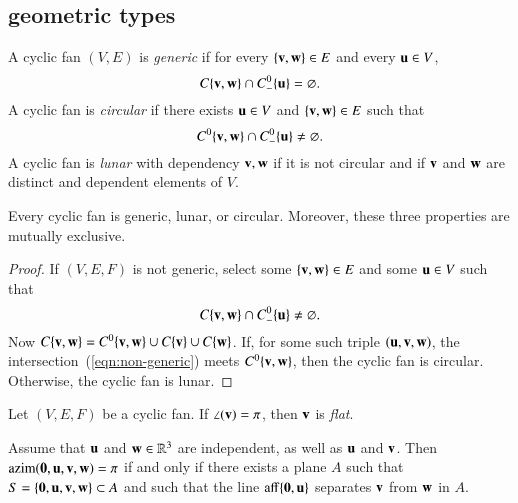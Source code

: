 \subsection{geometric types}\label{sec:types}

\begin{definition}
A cyclic fan $(V,E)$ is {\it generic} if for every $\{{\mathbf v},{\mathbf w}\}\in E$
and every ${\mathbf u}\in V$, 
$$
C\{{\mathbf v},{\mathbf w}\}\cap C^0_-\{{\mathbf u}\} = \varnothing.
$$
A cyclic fan is {\it circular} if there exists ${\mathbf u}\in V$ and $\{{\mathbf v},{\mathbf w}\}\in E$ such that 
$$
C^0\{{\mathbf v},{\mathbf w}\}\cap C^0_-\{{\mathbf u}\}\ne \varnothing.
$$
A cyclic fan is {\it lunar} with dependency ${\mathbf v},{\mathbf w}$ if it is not circular and if ${\mathbf v}$ and ${\mathbf w}$ are distinct and dependent elements of $V$.
\end{definition}
%
%
%


\begin{lemma} Every cyclic fan is
generic, lunar, or circular.  Moreover, these three properties are mutually exclusive.
\end{lemma}
%
%
%
%
%

\begin{proof} If $(V,E,F)$ is not generic,  select some $\{{\mathbf v},{\mathbf w}\}\in E$
and some ${\mathbf u}\in V$ such that
\begin{equation}\label{eqn:non-generic}
C\{{\mathbf v},{\mathbf w}\}\cap C^0_-\{{\mathbf u}\} \ne \varnothing.
\end{equation}
Now $C\{{\mathbf v},{\mathbf w}\} = C^0\{{\mathbf v},{\mathbf w}\} \cup C\{{\mathbf v}\}\cup C\{{\mathbf w}\}$.  
If, for some such triple $({\mathbf u},{\mathbf v},{\mathbf w})$, the intersection~(\ref{eqn:non-generic}) meets $C^0\{{\mathbf v},{\mathbf w}\}$, then the cyclic fan is circular.  
Otherwise, the cyclic fan is lunar. 
\end{proof}

\begin{definition}[flat] Let $(V,E,F)$ be a cyclic fan.
If $\angle({\mathbf v})=\pi$, then ${\mathbf v}$ is {\it flat}.
\end{definition}


\begin{lemma}  \label{lemma:coplanar}
Assume that ${\mathbf u}$ and ${\mathbf w}\in\mathbb{R}^3$ are independent, as well as ${\mathbf u}$ and ${\mathbf v}$.  Then ${\operatorname{azim}}({\mathbf 0},{\mathbf u},{\mathbf v},{\mathbf w})=\pi$
if and only if there exists a plane $A$ such that
$S=\{{\mathbf 0},{\mathbf u},{\mathbf v},{\mathbf w}\}\subset A$ and such that the line ${\operatorname{aff}}\{{\mathbf 0},{\mathbf u}\}$ separates ${\mathbf v}$ from ${\mathbf w}$ in $A$.
\end{lemma}


